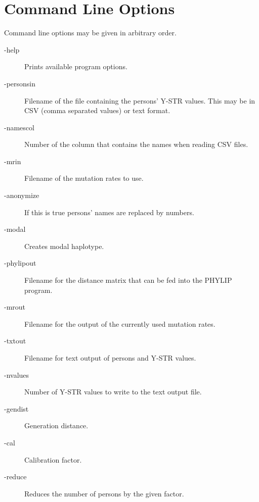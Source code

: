 \section{Command Line Options}

Command line options may be given in arbitrary order.

\begin{description}
\item[-help] Prints available program options.
\item[-personsin] Filename of the file containing the persons' Y-STR values.
	This may be in CSV (comma separated values) or text format.
\item[-namescol] Number of the column that contains the names
	when reading CSV files.
\item[-mrin] Filename of the mutation rates to use.
\item[-anonymize] If this is true persons' names are replaced by numbers.
\item[-modal] Creates modal haplotype.
\item[-phylipout] Filename for the distance matrix that can be fed into
	the PHYLIP\cite{Phylip} program.
\item[-mrout] Filename for the output of the currently used mutation rates.
\item[-txtout] Filename for text output of persons and Y-STR values.
\item[-nvalues] Number of Y-STR values to write to the text output file.
\item[-gendist] Generation distance.
\item[-cal] Calibration factor.
\item[-reduce] Reduces the number of persons by the given factor.
\end{description}

